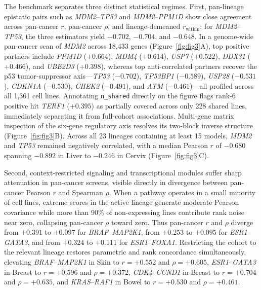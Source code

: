 \documentclass[11pt,a4paper]{article}
\begin{document}
The benchmark separates three distinct statistical regimes. First, pan-lineage epistatic pairs such as \textit{MDM2}--\textit{TP53} and \textit{MDM2}--\textit{PPM1D} show close agreement across pan-cancer $r$, pan-cancer $\rho$, and lineage-demeaned $r_{\mathrm{within}}$: for \textit{MDM2}--\textit{TP53}, the three estimators yield $-0.702$, $-0.704$, and $-0.648$. In a genome-wide pan-cancer scan of \textit{MDM2} across 18,433 genes (Figure~\ref{fig:fig3}A), top positive partners include \textit{PPM1D} ($+0.664$), \textit{MDM4} ($+0.614$), \textit{USP7} ($+0.522$), \textit{DDX31} ($+0.466$), and \textit{UBE2D3} ($+0.398$), whereas top anti-correlated partners recover the p53 tumor-suppressor axis---\textit{TP53} ($-0.702$), \textit{TP53BP1} ($-0.589$), \textit{USP28} ($-0.531$), \textit{CDKN1A} ($-0.530$), \textit{CHEK2} ($-0.491$), and \textit{ATM} ($-0.461$)---all profiled across all 1,361 cell lines. Annotating \texttt{n\_shared} directly on the figure flags rank-6 positive hit \textit{TERF1} ($+0.395$) as partially covered across only 228 shared lines, immediately separating it from full-cohort associations. Multi-gene matrix inspection of the six-gene regulatory axis resolves its two-block inverse structure (Figure~\ref{fig:fig3}B). Across all 23 lineages containing at least 15 models, \textit{MDM2} and \textit{TP53} remained negatively correlated, with a median Pearson $r$ of $-0.680$ spanning $-0.892$ in Liver to $-0.246$ in Cervix (Figure~\ref{fig:fig3}C).

Second, context-restricted signaling and transcriptional modules suffer sharp attenuation in pan-cancer screens, visible directly in divergence between pan-cancer Pearson $r$ and Spearman $\rho$. When a pathway operates in a small minority of cell lines, extreme scores in the active lineage generate moderate Pearson covariance while more than 90\% of non-expressing lines contribute rank noise near zero, collapsing pan-cancer $\rho$ toward zero. Thus pan-cancer $r$ and $\rho$ diverge from $+0.391$ to $+0.097$ for \textit{BRAF}--\textit{MAP2K1}, from $+0.253$ to $+0.095$ for \textit{ESR1}--\textit{GATA3}, and from $+0.324$ to $+0.111$ for \textit{ESR1}--\textit{FOXA1}. Restricting the cohort to the relevant lineage restores parametric and rank concordance simultaneously, elevating \textit{BRAF}--\textit{MAP2K1} in Skin to $r = +0.552$ and $\rho = +0.605$, \textit{ESR1}--\textit{GATA3} in Breast to $r = +0.596$ and $\rho = +0.372$, \textit{CDK4}--\textit{CCND1} in Breast to $r = +0.704$ and $\rho = +0.635$, and \textit{KRAS}--\textit{RAF1} in Bowel to $r = +0.530$ and $\rho = +0.461$.
\end{document}
